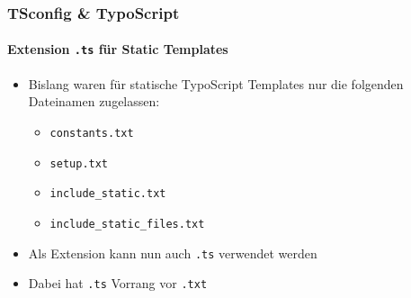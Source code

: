 
\begin{frame}[fragile]
	\frametitle{TSconfig \& TypoScript}
	\framesubtitle{Extension \texttt{.ts} für Static Templates}

	\begin{itemize}

		\item Bislang waren für statische TypoScript Templates nur die folgenden Dateinamen zugelassen:

			\begin{itemize}
				\item \texttt{constants.txt}
				\item \texttt{setup.txt}
				\item \texttt{include\_static.txt}
				\item \texttt{include\_static\_files.txt}
			\end{itemize}

		\item Als Extension kann nun auch \texttt{.ts} verwendet werden

		\item Dabei hat \texttt{.ts} Vorrang vor \texttt{.txt}

	\end{itemize}

\end{frame}


